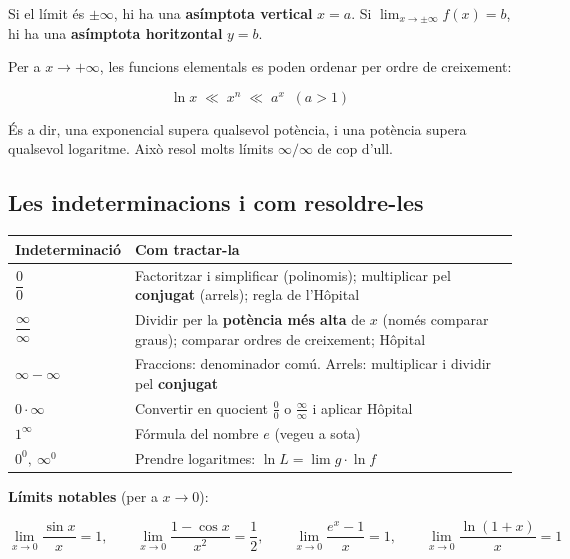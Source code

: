 Si el límit és $\pm\infty$, hi ha una \textbf{asímptota vertical} $x = a$. Si $\displaystyle\lim_{x\to\pm\infty} f(x) = b$, hi ha una \textbf{asímptota horitzontal} $y = b$.

Per a $x\to+\infty$, les funcions elementals es poden ordenar per ordre de creixement:

\begin{equation*}
\ln x \;\ll\; x^n \;\ll\; a^x \;\;(a>1)
\end{equation*}

És a dir, una exponencial supera qualsevol potència, i una potència supera qualsevol logaritme. Això resol molts límits $\infty/\infty$ de cop d'ull.

\subsection{Les indeterminacions i com resoldre-les}

\begin{table}[!htbp]
\centering
\renewcommand{\arraystretch}{1.75}
\begin{tabularx}{\textwidth}{l>{\raggedright\arraybackslash}X}
\toprule
Indeterminació & Com tractar-la \\
\midrule
$\displaystyle \dfrac{0}{0}$ & Factoritzar i simplificar (polinomis); multiplicar pel \textbf{conjugat} (arrels); regla de l'Hôpital \\
$\displaystyle \dfrac{\infty}{\infty}$ & Dividir per la \textbf{potència més alta} de $x$ (només comparar graus); comparar ordres de creixement; Hôpital \\
$\infty - \infty$ & Fraccions: denominador comú. Arrels: multiplicar i dividir pel \textbf{conjugat} \\
$0\cdot\infty$ & Convertir en quocient $\displaystyle \frac{0}{0}$ o $\displaystyle \frac{\infty}{\infty}$ i aplicar Hôpital \\
$1^{\infty}$ & Fórmula del nombre $e$ (vegeu a sota) \\
$0^0,\ \infty^0$ & Prendre logaritmes: $\ln L = \lim g\cdot\ln f$ \\
\bottomrule
\end{tabularx}
\end{table}

\textbf{Límits notables} (per a $x\to 0$):

\begin{equation*}
\lim_{x\to0}\frac{\sin x}{x}=1,\qquad \lim_{x\to0}\frac{1-\cos x}{x^2}=\frac12,\qquad \lim_{x\to0}\frac{e^x-1}{x}=1,\qquad \lim_{x\to0}\frac{\ln(1+x)}{x}=1
\end{equation*}

